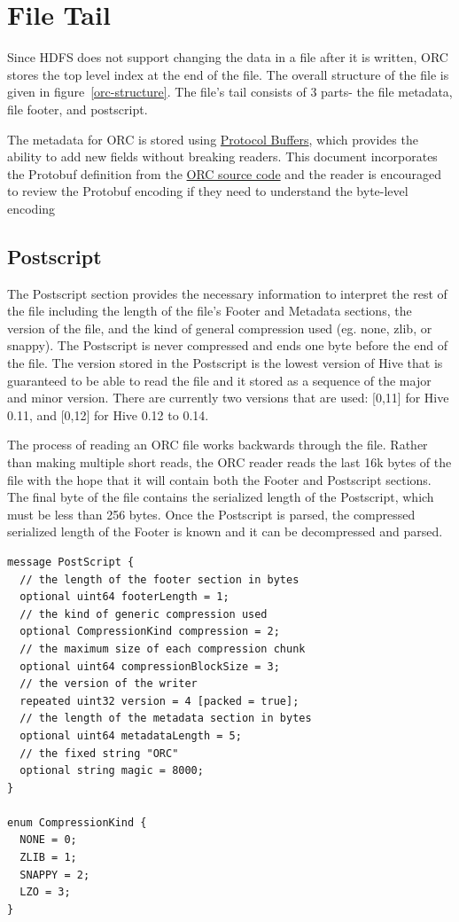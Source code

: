\documentclass{article}
\begin{document}
\section{File Tail}

Since HDFS does not support changing the data in a file after it is
written, ORC stores the top level index at the end of the file. The
overall structure of the file is given in figure~\ref{orc-structure}.
The file's tail consists of 3 parts- the file metadata, file footer,
and postscript. 

The metadata for ORC is stored using
\href{http://s.apache.org/protobuf_encoding}{Protocol Buffers}, which
provides the ability to add new fields without breaking readers. This
document incorporates the Protobuf definition from the
\href{http://s.apache.org/orc_proto}{ORC source code} and the reader
is encouraged to review the Protobuf encoding if they need to understand
the byte-level encoding

\subsection{Postscript}

The Postscript section provides the necessary information to interpret
the rest of the file including the length of the file's Footer and
Metadata sections, the version of the file, and the kind of general
compression used (eg. none, zlib, or snappy). The Postscript is never
compressed and ends one byte before the end of the file.  The version
stored in the Postscript is the lowest version of Hive that is
guaranteed to be able to read the file and it stored as a sequence of
the major and minor version. There are currently two versions that are
used: [0,11] for Hive 0.11, and [0,12] for Hive 0.12 to 0.14.

The process of reading an ORC file works backwards through the
file. Rather than making multiple short reads, the ORC reader reads
the last 16k bytes of the file with the hope that it will contain both
the Footer and Postscript sections. The final byte of the file
contains the serialized length of the Postscript, which must be less
than 256 bytes. Once the Postscript is parsed, the compressed
serialized length of the Footer is known and it can be decompressed
and parsed.

\begin{verbatim}
message PostScript {
  // the length of the footer section in bytes
  optional uint64 footerLength = 1;
  // the kind of generic compression used
  optional CompressionKind compression = 2;
  // the maximum size of each compression chunk
  optional uint64 compressionBlockSize = 3;
  // the version of the writer
  repeated uint32 version = 4 [packed = true];
  // the length of the metadata section in bytes
  optional uint64 metadataLength = 5;
  // the fixed string "ORC"
  optional string magic = 8000;
}

enum CompressionKind {
  NONE = 0;
  ZLIB = 1;
  SNAPPY = 2;
  LZO = 3;
}
\end{verbatim}
\end{document}
